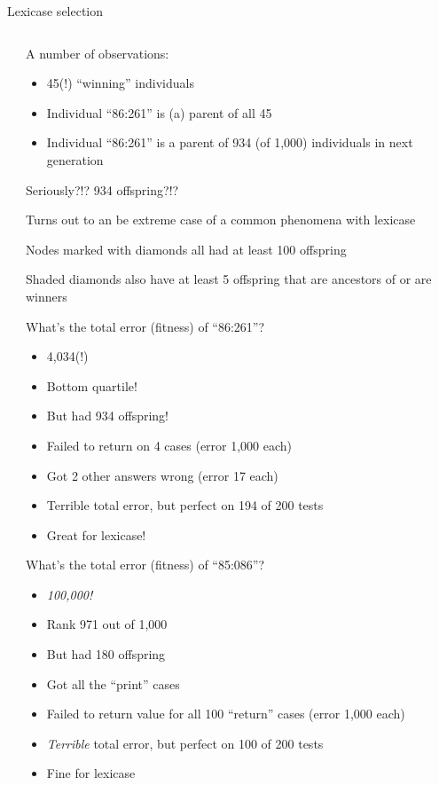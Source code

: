 \documentclass{beamer}
\newcommand{\linespace}{\vskip 0.25cm}
\begin{document}
\begin{frame}{Lexicase selection}
	\begin{columns}
		\begin{column}{0.5 \linewidth}
		\end{column}
		\begin{column}{0.45 \linewidth}
			\begin{overprint}
			A number of observations:
			\begin{itemize}
				\item 45(!) ``winning'' individuals
				\item Individual ``86:261'' is (a) parent of all 45
				\item Individual ``86:261'' is a parent of 934 (of 1,000) individuals in next generation
			\end{itemize}
			
			Seriously?!? 934 offspring?!?
			
			\linespace
			
			Turns out to an be extreme case of a common phenomena with lexicase
			
			\linespace
			
			Nodes marked with diamonds all had at least 100 offspring
			
			\linespace
			
			Shaded diamonds also have at least 5 offspring that are ancestors of or are winners
			
			What's the total error (fitness) of ``86:261''?
			\begin{itemize}
				\item<4> 4,034(!)
				\item<4> Bottom quartile!
				\item<4> But had 934 offspring! \linespace
				\item<4> Failed to return on 4 cases (error 1,000 each)
				\item<4> Got 2 other answers wrong (error 17 each)
				\item<4> Terrible total error, but perfect on 194 of 200 tests
				\item<4> Great for lexicase!
			\end{itemize}
						
			What's the total error (fitness) of ``85:086''?
			\begin{itemize}
				\item<6> \emph{100,000!}
				\item<6> Rank 971 out of 1,000
				\item<6> But had 180 offspring \linespace
				\item<6> Got all the ``print'' cases
				\item<6> Failed to return value for all 100 ``return'' cases (error 1,000 each)
				\item<6> \emph{Terrible} total error, but perfect on 100 of 200 tests
				\item<6> Fine for lexicase
			\end{itemize}
			

\end{overprint}
\end{column}
\end{columns}
\end{frame}
\end{document}
